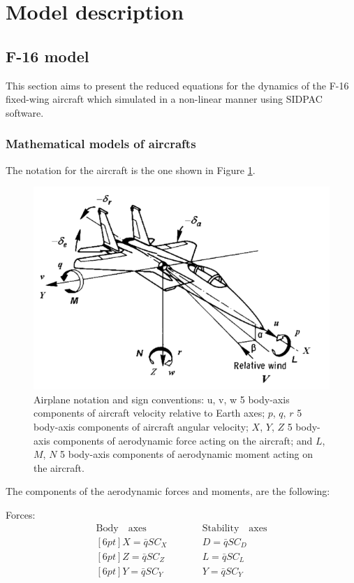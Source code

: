 \section{Model description}

\subsection{F-16 model}

This section aims to present the reduced equations for the dynamics of the F-16 fixed-wing aircraft which simulated in a non-linear manner using SIDPAC software.

\subsubsection{Mathematical models of aircrafts}

The notation for the aircraft is the one shown in Figure \ref{fig:aircraftNotation}.

\begin{figure}[!htpb]
  \centering
  \includegraphics[width=0.7 \textwidth]{figures/aircraftNotation}
  \caption[Airplane notation and sign conventions]{Airplane notation and sign conventions: u, v, w 5 body-axis components of aircraft velocity relative to Earth axes; $p$, $q$, $r$ 5 body-axis components of aircraft angular velocity; $X$, $Y$, $Z$ 5 body-axis components of aerodynamic force acting on the aircraft; and $L$, $M$, $N$ 5 body-axis components of aerodynamic moment acting on the aircraft.}
  \label{fig:aircraftNotation}
\end{figure}

The components of the aerodynamic forces and moments, are the following:

\noindent
Forces:
\begin{eqnarray}
\mathrm{Body \quad axes} \qquad && \mathrm{Stability \quad axes} \\ [6pt]
X = \bar{q}SC_X \qquad && D = \bar{q}SC_D \\ [6pt]
Z = \bar{q}SC_Z \qquad && L = \bar{q}SC_L \\ [6pt]
Y = \bar{q}SC_Y \qquad && Y = \bar{q}SC_Y
\end{eqnarray} 

